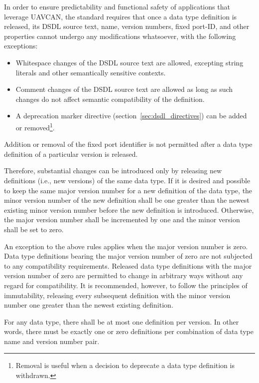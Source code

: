 In order to ensure predictability and functional safety of applications that leverage UAVCAN,
the standard requires that once a data type definition is released,
its DSDL source text, name, version numbers, fixed port-ID, and other properties cannot undergo any
modifications whatsoever, with the following exceptions:
\begin{itemize}
    \item Whitespace changes of the DSDL source text are allowed,
    excepting string literals and other semantically sensitive contexts.

    \item Comment changes of the DSDL source text are allowed as long as such changes
    do not affect semantic compatibility of the definition.

    \item A deprecation marker directive (section~\ref{sec:dsdl_directives}) can be added or removed\footnote{%
    Removal is useful when a decision to deprecate a data type definition is withdrawn.}.
\end{itemize}
Addition or removal of the fixed port identifier is not permitted after a data type definition
of a particular version is released.

Therefore, substantial changes can be introduced only by releasing new definitions (i.e., new versions)
of the same data type.
If it is desired and possible to keep the same major version number for a new definition of the data type,
the minor version number of the new definition shall be one greater than the newest existing minor version
number before the new definition is introduced.
Otherwise, the major version number shall be incremented by one and the minor version shall be set to zero.

An exception to the above rules applies when the major version number is zero.
Data type definitions bearing the major version number of zero are not subjected to any compatibility requirements.
Released data type definitions with the major version number of zero are permitted to change in arbitrary
ways without any regard for compatibility.
It is recommended, however, to follow the principles of immutability, releasing every subsequent definition
with the minor version number one greater than the newest existing definition.

For any data type, there shall be at most one definition per version.
In other words, there must be exactly one or zero definitions
per combination of data type name and version number pair.


